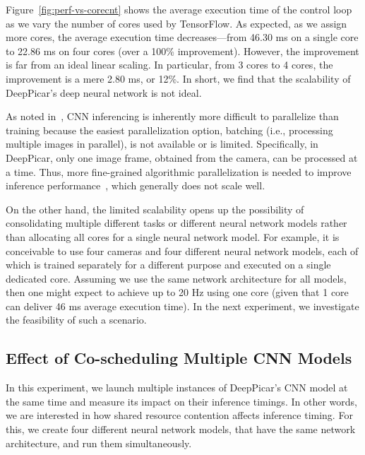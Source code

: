 Figure~\ref{fig:perf-vs-corecnt} shows the average execution time of
the control loop as we vary the number of cores used by
TensorFlow. As expected, as we assign more cores, the average execution
time decreases---from 46.30 ms on a single core to 22.86 ms on four
cores (over a 100\% improvement). However, the improvement is far from an ideal
linear scaling. In particular, from 3 cores to 4 cores, the
improvement is a mere 2.80 ms, or 12\%. In short, we find that the
scalability of DeepPicar's deep neural network is not ideal.

As noted in~\cite{NVIDIA2015}, CNN inferencing is inherently more
difficult to parallelize than training because the easiest
parallelization option, batching (i.e., processing multiple images in
parallel), is not available or is limited. Specifically, in DeepPicar,
only one image frame, obtained from the camera, can be processed at a
time. Thus, more fine-grained algorithmic parallelization is needed to
improve inference performance~\cite{NVIDIA2015}, which generally does
not scale well.

On the other hand, the limited scalability opens up the possibility of
consolidating multiple different tasks or different neural network
models rather than allocating all cores for a single neural network
model.
For example, it is conceivable to use four cameras and four different
neural network models, each of which is trained separately for a
different purpose and executed on a single dedicated core.
Assuming we use the same network
architecture for all models, then one might expect to achieve up to
20 Hz using one core (given that 1 core can deliver 46 ms average
execution time).
In the next experiment, we investigate the
feasibility of such a scenario.

\subsection{Effect of Co-scheduling Multiple CNN Models}

In this experiment, we launch multiple instances of DeepPicar's CNN
model at the same time and measure its impact on their inference
timings. In other words, we are interested in how shared resource
contention affects inference timing. For this, we create four different
neural network models, that have the same network architecture, and
run them simultaneously.

